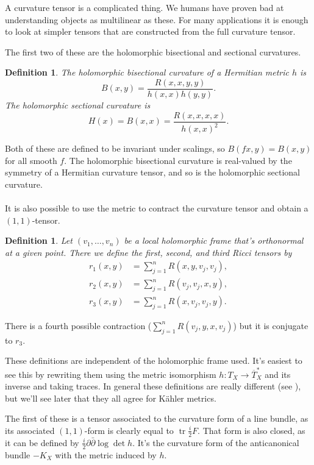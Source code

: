 \documentclass[10pt,a4paper]{article}
\newtheorem{defi}[theo]{Definition}
\DeclareMathOperator{\tr}{tr}
\begin{document}
A curvature tensor is a complicated thing. We humans have proven bad at understanding objects as multilinear as these. For many applications it is enough to look at simpler tensors that are constructed from the full curvature tensor.

The first two of these are the holomorphic bisectional and sectional curvatures.

\begin{defi}
  The \emph{holomorphic bisectional curvature} of a Hermitian metric $h$ is
$$
B(x,y) = \frac{R(x,x,y,y)}{h(x,x)h(y,y)}.
$$
The \emph{holomorphic sectional curvature} is
$$
H(x) = B(x,x) = \frac{R(x,x,x,x)}{h(x,x)^2}.
$$
\end{defi}

Both of these are defined to be invariant under scalings, so $B(fx,y) = B(x,y)$ for all smooth $f$. The holomorphic bisectional curvature is real-valued by the symmetry of a Hermitian curvature tensor, and so is the holomorphic sectional curvature.


\paragraph{}
It is also possible to use the metric to contract the curvature tensor and obtain a $(1,1)$-tensor.

\begin{defi}
  Let $(v_1, \ldots, v_n)$ be a local holomorphic frame that's orthonormal at a given point. There we define the \emph{first}, \emph{second}, and \emph{third Ricci tensors} by
\begin{align*}
r_1(x,y) &= \sum_{j=1}^n R(x,y,v_j,v_j),
\\
r_2(x,y) &= \sum_{j=1}^n R(v_j, v_j, x,y),
\\
r_3(x,y) &= \sum_{j=1}^n R(x,v_j,v_j,y).
\end{align*}
\end{defi}

There is a fourth possible contraction ($\sum_{j=1}^n R(v_j,y,x,v_j)$) but it is conjugate to $r_3$.

These definitions are independent of the holomorphic frame used. It's easiest to see this by rewriting them using the metric isomorphism $h : T_X \to \overline T_X^*$ and its inverse and taking traces. In general these definitions are really different (see ), but we'll see later that they all agree for K\"ahler metrics.

The first of these is a tensor associated to the curvature form of a line bundle, as its associated $(1,1)$-form is clearly equal to $\tr \frac i2 F$. That form is also closed, as it can be defined by $\frac i2 \partial\bar\partial \log \det h$. It's the curvature form of the anticanonical bundle $-K_X$ with the metric induced by $h$.
\end{document}

